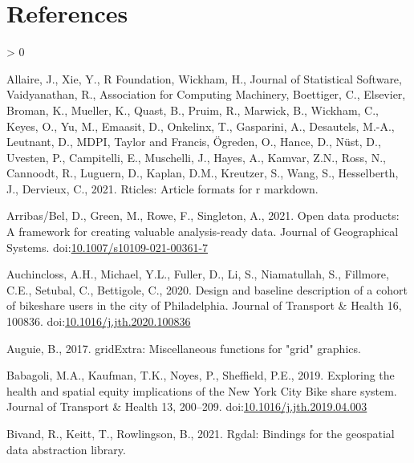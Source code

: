 \documentclass[]{elsarticle} %
\newlength{\cslhangindent}
\newenvironment{CSLReferences}[2] %
 {%
  \setlength{\parindent}{0pt}
  \ifodd #1 \everypar{\setlength{\hangindent}{\cslhangindent}}\ignorespaces\fi
  \ifnum #2 > 0
  \setlength{\parskip}{#2\baselineskip}
  \fi
 }%
 {}
\begin{document}
\hypertarget{references}{%
\section*{References}\label{references}}

\hypertarget{refs}{}
\begin{CSLReferences}{1}{0}
\leavevmode\hypertarget{ref-R-rticles}{}%
Allaire, J., Xie, Y., R Foundation, Wickham, H., Journal of Statistical
Software, Vaidyanathan, R., Association for Computing Machinery,
Boettiger, C., Elsevier, Broman, K., Mueller, K., Quast, B., Pruim, R.,
Marwick, B., Wickham, C., Keyes, O., Yu, M., Emaasit, D., Onkelinx, T.,
Gasparini, A., Desautels, M.-A., Leutnant, D., MDPI, Taylor and Francis,
Ögreden, O., Hance, D., Nüst, D., Uvesten, P., Campitelli, E.,
Muschelli, J., Hayes, A., Kamvar, Z.N., Ross, N., Cannoodt, R., Luguern,
D., Kaplan, D.M., Kreutzer, S., Wang, S., Hesselberth, J., Dervieux, C.,
2021. Rticles: Article formats for r markdown.

\leavevmode\hypertarget{ref-arribas2021open}{}%
Arribas/Bel, D., Green, M., Rowe, F., Singleton, A., 2021. Open data
products: A framework for creating valuable analysis-ready data. Journal
of Geographical Systems.
doi:\href{https://doi.org/10.1007/s10109-021-00361-7}{10.1007/s10109-021-00361-7}

\leavevmode\hypertarget{ref-auchinclossDesignBaselineDescription2020}{}%
Auchincloss, A.H., Michael, Y.L., Fuller, D., Li, S., Niamatullah, S.,
Fillmore, C.E., Setubal, C., Bettigole, C., 2020. Design and baseline
description of a cohort of bikeshare users in the city of
{Philadelphia}. Journal of Transport \& Health 16, 100836.
doi:\href{https://doi.org/10.1016/j.jth.2020.100836}{10.1016/j.jth.2020.100836}

\leavevmode\hypertarget{ref-R-gridExtra}{}%
Auguie, B., 2017. gridExtra: Miscellaneous functions for "grid"
graphics.

\leavevmode\hypertarget{ref-babagoliExploringHealthSpatial2019}{}%
Babagoli, M.A., Kaufman, T.K., Noyes, P., Sheffield, P.E., 2019.
Exploring the health and spatial equity implications of the {New York
City Bike} share system. Journal of Transport \& Health 13, 200--209.
doi:\href{https://doi.org/10.1016/j.jth.2019.04.003}{10.1016/j.jth.2019.04.003}

\leavevmode\hypertarget{ref-R-rgdal}{}%
Bivand, R., Keitt, T., Rowlingson, B., 2021. Rgdal: Bindings for the
geospatial data abstraction library.


\end{CSLReferences}
\end{document}
